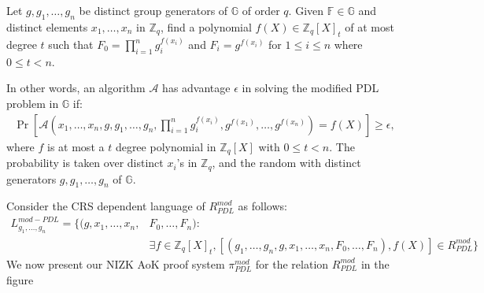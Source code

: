 \begin{definition}
  Let $g,g_1,\dots,g_n$ be distinct group generators of $\mathbb{G}$ of order $q$. 
  Given $\mathbb{F}\in\mathbb{G}$ and distinct elements $x_1,\dots,x_n$ in $\mathbb{Z}_q$, find 
  a polynomial $f(X)\in\mathbb{Z}_q[X]_t$ of at most degree $t$ such that 
  $F_0=\prod_{i=1}^{n}g_i^{f(x_i)}$ and $F_i=g^{f(x_i)}$ for $1\leq i\leq n$ where $0\leq t<n$.\par

  In other words, an algorithm $\mathcal{A}$ has advantage $\epsilon$ in solving the modified PDL problem in 
  $\mathbb{G}$ if:
  \begin{align*}
    \Pr[\mathcal{A}(x_1,\dots,x_n,g,g_1,\dots,g_n,\prod_{i=1}^{n}g_i^{f(x_i)},g^{f(x_1)},\dots,g^{f(x_n)})=f(X)]\geq \epsilon,
  \end{align*}
  where $f$ is at most a $t$ degree polynomial in $\mathbb{Z}_q[X]$ with $0\leq t<n$. The 
  probability is taken over distinct $x_i$'s in $\mathbb{Z}_q$, and the random with distinct 
  generators $g,g_1,\dots,g_n$ of $\mathbb{G}$.
\end{definition}

Consider the CRS dependent language of $R_{PDL}^{mod}$ as follows:
\begin{align*}
  L_{g_1,\dots,g_n}^{mod-PDL} = \{(g,x_1,\dots,x_n,&F_0,\dots,F_n) :\\ &\exists f\in\mathbb{Z}_q[X]_t, [(g_1,\dots,g_n,g,x_1,\dots,x_n,F_0,\dots,F_n),f(X)]\in R_{PDL}^{mod}\}
\end{align*}
We now present our NIZK AoK proof system $\pi_{PDL}^{mod}$ for the relation $R_{PDL}^{mod}$ in the 
figure 

